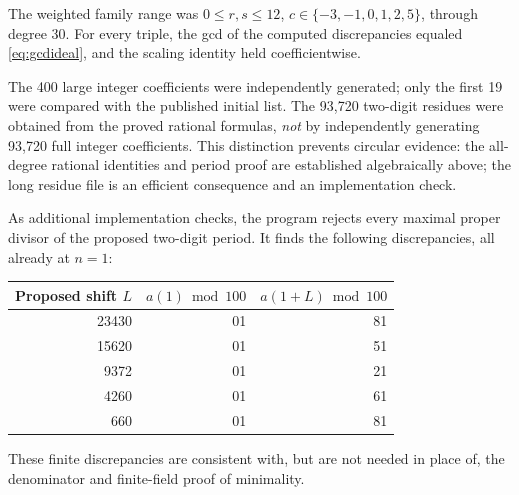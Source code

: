 \documentclass[11pt,letterpaper]{article}
\theoremstyle{definition}
\theoremstyle{remark}
\begin{document}
The weighted family range was
$0\leq r,s\leq12$, $c\in\{-3,-1,0,1,2,5\}$, through degree $30$.
For every triple, the gcd of the computed discrepancies equaled
\eqref{eq:gcdideal}, and the scaling identity held coefficientwise.

The 400 large integer coefficients were independently generated; only
the first 19 were compared with the published initial list.
The 93,720 two-digit residues were obtained from the proved rational
formulas, \emph{not} by independently generating 93,720 full integer
coefficients.  This distinction prevents circular evidence: the
all-degree rational identities and period proof are established
algebraically above; the long residue file is an efficient consequence
and an implementation check.

As additional implementation checks, the program rejects every
maximal proper divisor of the proposed two-digit period.  It finds
the following discrepancies, all already at $n=1$:
\begin{center}
\begin{tabular}{@{}rrr@{}}
\toprule
Proposed shift $L$ & $a(1)\bmod100$ & $a(1+L)\bmod100$\\
\midrule
23430&01&81\\
15620&01&51\\
9372&01&21\\
4260&01&61\\
660&01&81\\
\bottomrule
\end{tabular}
\end{center}
These finite discrepancies are consistent with, but are not needed in
place of, the denominator and finite-field proof of minimality.
\end{document}
